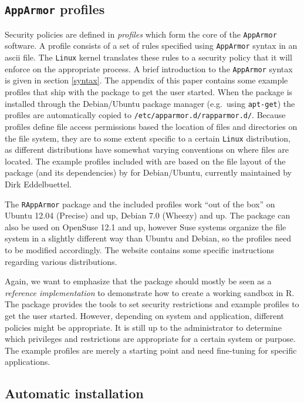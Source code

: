 \documentclass{jss}
\newcommand{\R}{\textsf{R}\xspace}
\newcommand{\AppArmor}{\texttt{AppArmor}\xspace}
\newcommand{\RAppArmor}{\pkg{RAppArmor}\xspace}
\newcommand{\Linux}{\texttt{Linux}\xspace}
\begin{document}
\subsection[AppArmor profiles]{\AppArmor profiles}

Security policies are defined in \emph{profiles} which form the core of the \AppArmor
software. A profile consists of a set of rules specified using \AppArmor syntax in an ascii file. The
\Linux kernel translates these rules to a security policy that it will enforce
on the appropriate process. A brief introduction to the \AppArmor syntax is
given in section \ref{syntax}. The appendix of this paper contains some example
profiles that ship with the \RAppArmor package to get the user started.
When the package is installed through the Debian/Ubuntu package manager (e.g.\ using
\texttt{apt-get}) the profiles are automatically copied to
\texttt{/etc/apparmor.d/rapparmor.d/}. Because profiles define file access
permissions based the location of files and directories on the file system,
they are to some extent specific to a certain \Linux distribution, as different
distributions have somewhat varying conventions on where files are located. The
example profiles included with \RAppArmor are based on the file layout of
the  package (and its dependencies) by \cite{batesusing} for
Debian/Ubuntu, currently maintained by Dirk Eddelbuettel.

The \texttt{RAppArmor} package and the included profiles work ``out of the
box'' on Ubuntu 12.04 (Precise) and up, Debian 7.0 (Wheezy) and up. The package can also be used on OpenSuse 12.1 and up, however Suse systems organize the file system in a
slightly different way than Ubuntu and Debian, so the profiles need to be
modified accordingly. The \RAppArmor website contains some specific instructions regarding various distributions.


Again, we want to emphasize that the package should mostly
be seen as a \emph{reference implementation} to demonstrate
how to create a working sandbox in \R. The \RAppArmor
package provides the tools to set security restrictions and example profiles to get the user started. However, depending on system and application, different policies might be appropriate. 
It is still up to the administrator to determine which privileges and restrictions are appropriate for a certain system or purpose. The example profiles are merely a starting point and need
 fine-tuning for specific applications.

\subsection{Automatic installation}
\end{document}
